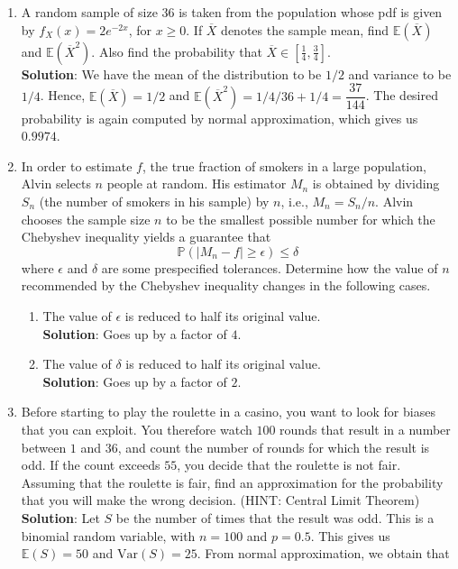 \documentclass{article}
\newcommand{\abs}[1]{\displaystyle\left\lvert#1\right\rvert}
\newcommand{\Pb}{\mathbb{P}}
\newcommand{\Eb}{\mathbb{E}}
\newcommand{\soln}[1]{\textbf{Solution}:#1}
\newcommand{\bkt}[1]{\left(#1\right)}
\begin{document}
\begin{enumerate}
{		}
		\item
		A random sample of size $36$ is taken from the population whose pdf is given by $f_X(x) = 2e^{-2x}$, for $x \geq 0$. If $\overline{X}$ denotes the sample mean, find $\Eb\bkt{\overline{X}}$ and $\Eb\bkt{\overline{X}^2}$. Also find the probability that $\overline{X} \in \left[\frac14,\frac34\right]$.\\
		\soln{
		We have the mean of the distribution to be $1/2$ and variance to be $1/4$. Hence, $\Eb\bkt{\overline{X}} = 1/2$ and $\Eb\bkt{\overline{X}^2} = 1/4/36 + 1/4 = \dfrac{37}{144}$. The desired probability is again computed by normal approximation, which gives us $0.9974$.
		}
		\item
		In order to estimate $f$, the true fraction of smokers in a large population, Alvin selects $n$ people at random. His estimator $M_n$ is obtained by dividing $S_n$ (the number of smokers in his sample) by $n$, i.e., $M_n=S_n/n$. Alvin chooses the sample size $n$ to be the smallest possible number for which the Chebyshev inequality yields a guarantee that 
		$$\Pb \bkt{\abs{M_n-f} \geq \epsilon} \leq \delta$$
		where $\epsilon$ and $\delta$ are some prespecified tolerances. Determine how the value of $n$ recommended by the Chebyshev inequality changes in the following cases.
		\begin{enumerate}
			\item
			The value of $\epsilon$ is reduced to half its original value.\\
			\soln{
			Goes up by a factor of $4$.
			}
			\item
			The value of $\delta$ is reduced to half its original value.\\
			\soln{
			Goes up by a factor of $2$.
			}
		\end{enumerate}
		\item
		Before starting to play the roulette in a casino, you want to look for biases that you can exploit. You therefore watch $100$ rounds that result in a number between $1$ and $36$, and count the number of rounds for which the result is odd. If the count exceeds $55$, you decide that the roulette is not fair. Assuming that the roulette is fair, find an approximation for the probability that you will make the wrong decision. (HINT: Central Limit Theorem)\\
		\soln{
		Let $S$ be the number of times that the result was odd. This is a binomial random variable, with $n=100$ and $p=0.5$. This gives us $\Eb\bkt{S} = 50$ and $\text{Var}\bkt{S} = 25$. From normal approximation, we obtain that
}
\end{enumerate}
\end{document}
